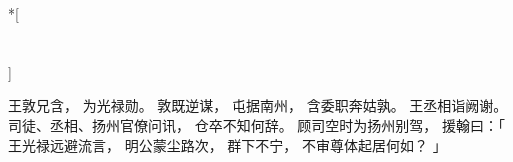 
\switchcolumn[0]*[\section{}]

王敦兄含，
为光禄勋。
敦既逆谋，
屯据南州，
含委职奔姑孰。
王丞相诣阙谢。
司徒、丞相、扬州官僚问讯，
仓卒不知何辞。
顾司空时为扬州别驾，
援翰曰：「
    王光禄远避流言，
    明公蒙尘路次，
    群下不宁，
    不审尊体起居何如？
」

\switchcolumn



